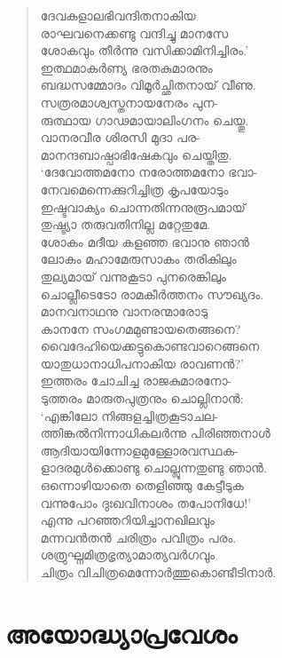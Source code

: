 \begin{verse}
ദേവകളാലഭിവന്ദിതനാകിയ\\
രാഘവനെക്കണ്ടു വന്ദിച്ചു മാനസേ\\
ശോകവും തീര്‍ന്നു വസിക്കാമിനിച്ചിരം.’\\
ഇത്ഥമാകര്‍ണ്യ ഭരതകുമാരനും\\
ബദ്ധസമ്മോദം വിമൂര്‍ച്ഛിതനായ് വീണു.\\
സത്രരമാശ്വസ്തനായനേരം പുന-\\
രുത്ഥായ ഗാഢമായാലിംഗനം ചെയ്തു.\\
വാനരവീര ശിരസി മുദാ പര-\\
മാനന്ദബാഷ്പാഭിഷേകവും ചെയ്തിതു.\\
‘ദേവോത്തമനോ നരോത്തമനോ ഭവാ-\\
നേവമെന്നെക്കുറിച്ചിത്ര കൃപയോടും\\
ഇഷ്ടവാക്യം ചൊന്നതിന്നനുരൂപമായ്\\
തുഷ്ട്യാ തരുവതിനില്ല മറ്റേതുമേ.\\
ശോകം മദീയ കളഞ്ഞ ഭവാനു ഞാന്‍\\
ലോകം മഹാമേരുസാകം തരികിലും\\
തുല്യമായ് വന്നുകൂടാ പുനരെങ്കിലും\\
ചൊല്ലീടെടോ രാമകീര്‍ത്തനം സൗഖ്യദം.\\
മാനവനാഥനു വാനരന്മാരോടു\\
കാനനേ സംഗമമുണ്ടായതെങ്ങനെ?\\
വൈദേഹിയെക്കട്ടുകൊണ്ടവാറെങ്ങനെ\\
യാതുധാനാധിപനാകിയ രാവണന്‍?’\\
ഇത്തരം ചോചിച്ച രാജകുമാരനോ-\\
ടുത്തരം മാരുതപുത്രനും ചൊല്ലിനാന്‍:\\
‘എങ്കിലോ നിങ്ങളച്ചിത്രകൂടാചല-\\
ത്തിങ്കല്‍നിന്നാധികലര്‍ന്നു പിരിഞ്ഞനാള്‍\\
ആദിയായിന്നോളമുള്ളോരവസ്ഥക-\\
ളാദരമുള്‍ക്കൊണ്ടു ചൊല്ലുന്നതുണ്ടു ഞാന്‍.\\
ഒന്നൊഴിയാതെ തെളിഞ്ഞു കേട്ടീടുക\\
വന്നുപോം ദുഃഖവിനാശം തപോനിധേ!’\\
എന്നു പറഞ്ഞറിയിച്ചാനഖിലവും\\
മന്നവന്‍തന്‍ ചരിത്രം പവിത്രം പരം.\\
ശത്രുഘ്നമിത്രഭൃത്യാമാത്യവര്‍ഗവും\\
ചിത്രം വിചിത്രമെന്നോര്‍ത്തുകൊണ്ടീടിനാര്‍.
\end{verse}


\section{അയോദ്ധ്യാപ്രവേശം}


